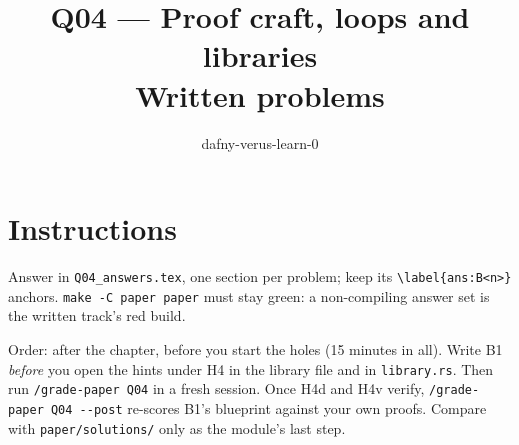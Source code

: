 \documentclass[11pt]{article}
\title{Q04 --- Proof craft, loops and libraries \\ \large Written problems}
\author{dafny-verus-learn-0}
\date{}
\begin{document}
\maketitle

\section*{Instructions}
Answer in \texttt{Q04\_answers.tex}, one section per problem; keep its
\verb+\label{ans:B<n>}+ anchors. \texttt{make -C paper paper} must stay green:
a non-compiling answer set is the written track's red build.

Order: after the chapter, before you start the holes (15 minutes in all). Write
B1 \emph{before} you open the hints under H4 in the library file and in
\texttt{library.rs}. Then run \texttt{/grade-paper Q04} in a fresh session.
Once H4d and H4v verify, \verb+/grade-paper Q04 --post+ re-scores B1's
blueprint against your own proofs. Compare with \texttt{paper/solutions/} only
as the module's last step.
\end{document}
